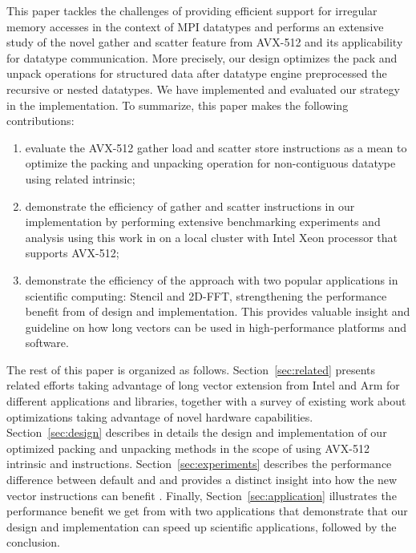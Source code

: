 \documentclass[conference]{IEEEtran}
\begin{document}
This paper tackles the challenges of providing efficient support for irregular
memory accesses in the context of MPI datatypes and performs an extensive study
of the novel gather and scatter feature from AVX-512 and its applicability for
\mpi datatype communication.
%
More precisely, our design optimizes the pack and unpack operations for structured
data after datatype engine preprocessed the recursive or nested datatypes. We
have implemented and evaluated our strategy in the \ompi \mpi implementation.
To summarize, this paper makes the following contributions:
\begin{enumerate}
%
  \item evaluate the AVX-512 gather load and scatter store instructions as a mean
  to optimize the packing and unpacking operation for non-contiguous datatype
  using related intrinsic;
%
  \item demonstrate the efficiency of gather and scatter instructions in our
  implementation by performing extensive benchmarking experiments and analysis
  using this work in \ompi on a local cluster with Intel Xeon processor that
  supports AVX-512;
%
  \item demonstrate the efficiency of the approach with two popular applications
  in scientific computing: Stencil and 2D-FFT, strengthening the performance
  benefit from of design and implementation. This provides valuable insight and
  guideline on how long vectors can be used in high-performance platforms and
  software.
\end{enumerate}

The rest of this paper is organized as follows.
%
Section~\ref{sec:related} presents related efforts taking advantage of long
vector extension from Intel and Arm for different applications and libraries,
together with a survey of existing work about \mpi optimizations taking
advantage of novel hardware capabilities.
%
Section~\ref{sec:design} describes in details the design and implementation of
our optimized packing and unpacking methods in the scope of \ompi using AVX-512
intrinsic and instructions.
%
Section~\ref{sec:experiments} describes the performance difference between
default \ompi and \ourwork and provides a distinct insight into how the new
vector instructions can benefit \mpi.
%
Finally, Section~\ref{sec:application} illustrates the performance benefit we
get from \ourwork with two applications that demonstrate that our design and
implementation can speed up scientific applications, followed by the conclusion.
\end{document}
